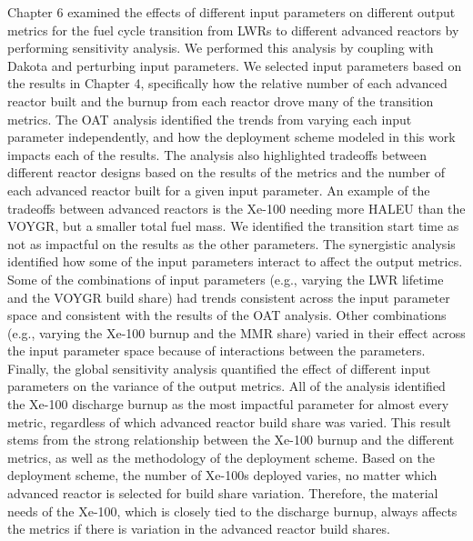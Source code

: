 Chapter 6 examined the effects of different input parameters 
on different output metrics for the fuel cycle transition from 
\glspl{LWR} to different advanced reactors by performing sensitivity 
analysis. We performed this analysis by coupling \Cyclus with Dakota 
and perturbing input parameters. We selected input parameters based 
on the results in Chapter 4, specifically how the 
relative number of each advanced reactor built and the burnup from 
each reactor drove many of the transition metrics. 
The \acrfull{OAT} analysis identified the 
trends from varying each input parameter independently, and how the deployment 
scheme modeled in this work impacts each of the results. The analysis also 
highlighted tradeoffs between different reactor designs based on 
the results of the metrics and the number of each advanced reactor 
built for a given input parameter. An example of the tradeoffs between 
advanced reactors is the Xe-100 
needing more \gls{HALEU} than the VOYGR, but a smaller total fuel mass. We identified 
the transition start time as not as impactful on 
the results as the other parameters. The synergistic 
analysis identified how some of the input parameters interact to affect the output 
metrics. Some of the combinations of input parameters (e.g., varying 
the \gls{LWR} lifetime and the VOYGR build share) had trends consistent 
across the input parameter space and consistent with the results of 
the \gls{OAT} analysis. Other combinations (e.g., varying the Xe-100 
burnup and the \gls{MMR} share) varied in their effect across the input parameter 
space because of interactions between the parameters. Finally, the global 
sensitivity analysis quantified the effect of different input parameters 
on the variance of the output metrics. All of the analysis 
identified the Xe-100 discharge burnup as the most impactful parameter
for almost every metric, regardless of which advanced reactor build share 
was varied. This result stems from the strong relationship between 
the Xe-100 burnup and the different metrics, as well as the methodology 
of the deployment scheme. Based on the deployment scheme, the number of 
Xe-100s deployed varies, no matter which advanced reactor is selected for 
build share variation. Therefore, the material needs of the 
Xe-100, which is closely tied to the discharge burnup, always 
affects the metrics if there is variation in the advanced reactor 
build shares. 

